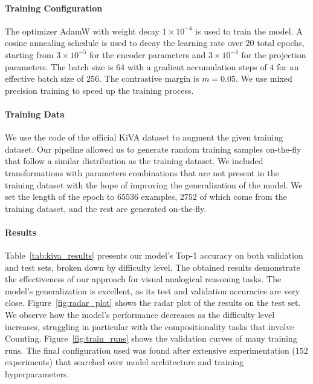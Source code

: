 \documentclass[twocolumn]{article} %
\begin{document}
\paragraph{Training Configuration}
The optimizer AdamW with weight decay $1 \times 10^{-4}$ is used to train the model. 
A cosine annealing schedule is used to decay the learning rate over $20$ total epochs, starting from $3 \times 10^{-5}$ for the encoder parameters and $3 \times 10^{-4}$ for the projection parameters. The batch size is $64$ with a gradient accumulation steps of $4$ for an effective batch size of $256$. The contrastive margin is $m = 0.05$.
We use mixed precision training to speed up the training process.

\paragraph{Training Data}
We use the code of the official KiVA dataset\cite{yee2025kiva} to augment the given training dataset. Our pipeline allowed us to generate random training samples on-the-fly that follow a similar distribution as the training dataset. We included transformations with parameters combinations that are not present in the training dataset with the hope of improving the generalization of the model. We set the length of the epoch to $65536$ examples, $2752$ of which come from the training dataset, and the rest are generated on-the-fly.

\paragraph{Results} Table~\ref{tab:kiva_results} presents our model's Top-1 accuracy on both validation and test sets, broken down by difficulty level. The obtained results demonstrate the effectiveness of our approach for visual analogical reasoning tasks. The model's generalization is excellent, as its test and validation accuracies are very close. 
Figure~\ref{fig:radar_plot} shows the radar plot of the results on the test set. We observe how the model's performance decreases as the difficulty level increases, struggling in particular with the compositionality tasks that involve Counting. 
Figure~\ref{fig:train_runs} shows the validation curves of many training runs. The final configuration used was found after extensive experimentation ($152$ experiments) that searched over model architecture and training hyperparameters.
\end{document}
